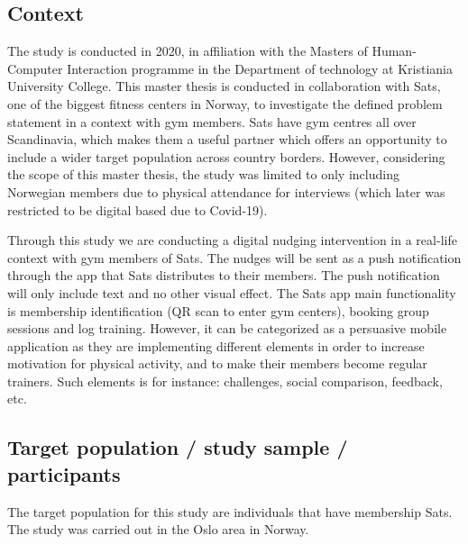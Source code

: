 \subsection{Context  }

The study is conducted in 2020, in affiliation with the Masters of Human-Computer Interaction programme in the Department of technology at Kristiania University College. This master thesis is conducted in collaboration with Sats, one of the biggest fitness centers in Norway, to investigate the defined problem statement in a context with gym members. Sats have gym centres all over Scandinavia, which makes them a useful partner which offers an opportunity to include a wider target population across country borders. However, considering the scope of this master thesis, the study was limited to only including Norwegian members due to physical attendance for interviews (which later was restricted to be digital based due to Covid-19). 

Through this study we are conducting a digital nudging intervention in a real-life context with gym members of Sats. The nudges will be sent as a push notification through the app that Sats distributes to their members. The push notification will only include text and no other visual effect. The Sats app main functionality is membership identification (QR scan to enter gym centers), booking group sessions and log training. However, it can be categorized as a persuasive mobile application as they are implementing different elements in order to increase motivation for physical activity, and to make their members become regular trainers. Such elements is for instance: challenges, social comparison, feedback, etc. 

\subsection{Target population / study sample / participants}

The target population for this study are individuals that have membership Sats. The study was carried out in the Oslo area in Norway.  


